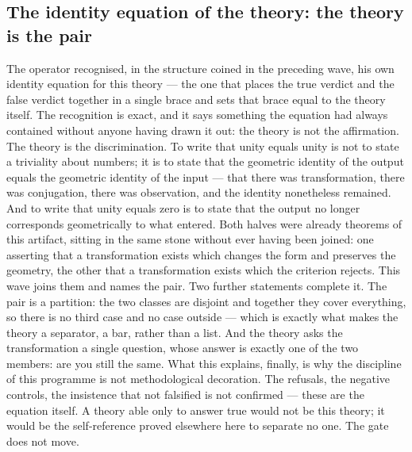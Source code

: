 \documentclass[11pt]{article}
\theoremstyle{definition}\newtheorem{deriv}{Derivation}
\begin{document}
\subsection*{The identity equation of the theory: the theory is the pair}The operator recognised, in the structure coined in the preceding wave, his own identity equation for this theory --- the one that places the true verdict and the false verdict together in a single brace and sets that brace equal to the theory itself. The recognition is exact, and it says something the equation had always contained without anyone having drawn it out: the theory is not the affirmation. The theory is the discrimination. To write that unity equals unity is not to state a triviality about numbers; it is to state that the geometric identity of the output equals the geometric identity of the input --- that there was transformation, there was conjugation, there was observation, and the identity nonetheless remained. And to write that unity equals zero is to state that the output no longer corresponds geometrically to what entered. Both halves were already theorems of this artifact, sitting in the same stone without ever having been joined: one asserting that a transformation exists which changes the form and preserves the geometry, the other that a transformation exists which the criterion rejects. This wave joins them and names the pair. Two further statements complete it. The pair is a partition: the two classes are disjoint and together they cover everything, so there is no third case and no case outside --- which is exactly what makes the theory a separator, a bar, rather than a list. And the theory asks the transformation a single question, whose answer is exactly one of the two members: are you still the same. What this explains, finally, is why the discipline of this programme is not methodological decoration. The refusals, the negative controls, the insistence that not falsified is not confirmed --- these are the equation itself. A theory able only to answer true would not be this theory; it would be the self-reference proved elsewhere here to separate no one. The gate does not move.
\end{document}
